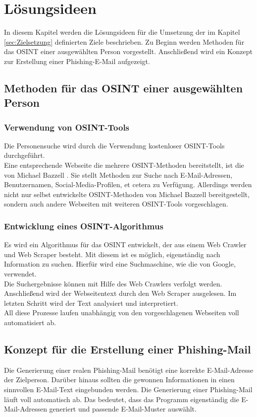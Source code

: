 
\chapter{Lösungsideen}  %
\label{cha:Lösungsideen} %
In diesem Kapitel werden die Lösungsideen für die Umsetzung der im Kapitel \ref{sec:Zielsetzung} definierten Ziele beschrieben. Zu Beginn werden Methoden für das OSINT einer ausgewählten Person vorgestellt. Anschließend wird ein Konzept zur Erstellung einer Phishing-E-Mail aufgezeigt.

\section{Methoden für das OSINT einer ausgewählten Person}
	\subsection{Verwendung von OSINT-Tools}
	Die Personensuche wird durch die Verwendung kostenloser OSINT-Tools durchgeführt.\\ 
	Eine entsprechende Webseite die mehrere OSINT-Methoden bereitstellt, ist die von Michael Bazzell \cite{intelTechniques}. Sie stellt Methoden zur Suche nach E-Mail-Adressen, Benutzernamen, Social-Media-Profilen, et cetera zu Verfügung. Allerdings werden nicht nur selbst entwickelte OSINT-Methoden von Michael Bazzell bereitgestellt, sondern auch andere Webseiten mit weiteren OSINT-Tools vorgeschlagen.
	
	\subsection{Entwicklung eines OSINT-Algorithmus}
	Es wird ein Algorithmus für das OSINT entwickelt, der aus einem Web Crawler und Web Scraper besteht. Mit diesem ist es möglich, eigenständig nach Information zu suchen. Hierfür wird eine Suchmaschine, wie die von Google, verwendet.\\
	Die Suchergebnisse können mit Hilfe des Web Crawlers verfolgt werden. Anschließend wird der Webseitentext durch den Web Scraper ausgelesen. Im letzten Schritt wird der Text analysiert und interpretiert.\\
	All diese Prozesse laufen unabhängig von den vorgeschlagenen Webseiten voll automatisiert ab.

	
\section{Konzept für die Erstellung einer Phishing-Mail}
Die Generierung einer realen Phishing-Mail benötigt eine korrekte E-Mail-Adresse der Zielperson. Darüber hinaus sollten die gewonnen Informationen in einen sinnvollen E-Mail-Text eingebunden werden. Die Generierung einer Phishing-Mail läuft voll automatisch ab. Das bedeutet, dass das Programm eigenständig die E-Mail-Adressen generiert und passende E-Mail-Muster auswählt.
	
